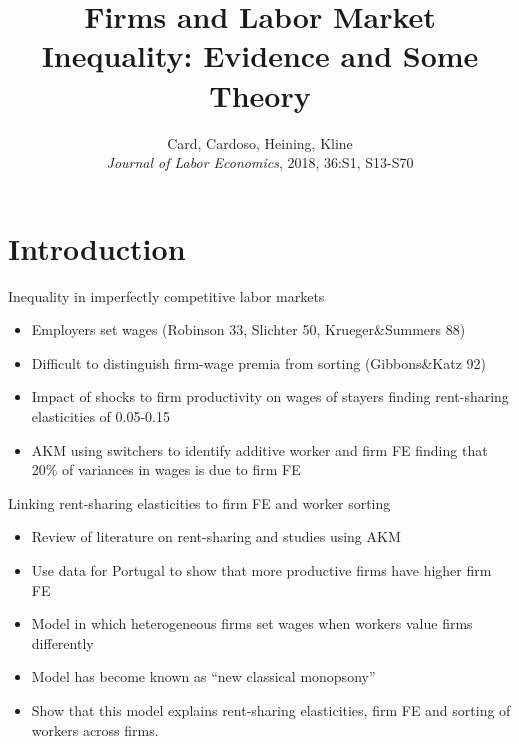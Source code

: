 \documentclass[notes=show]{beamer}
\begin{document}
\title{Firms and Labor Market Inequality: Evidence and Some Theory}
\subtitle{}
\date{Card, Cardoso, Heining, Kline \bigskip \\
\textit{Journal of Labor Economics}, 2018, 36:S1, S13-S70}
\author{}
\maketitle

\section{Introduction}

\begin{frame}{Inequality in imperfectly competitive labor markets}
\begin{itemize}
\item Employers set wages (Robinson 33, Slichter 50, Krueger\&Summers 88) \medskip
\item Difficult to distinguish firm-wage premia from sorting (Gibbons\&Katz 92) \medskip
\item Impact of shocks to firm productivity on wages of stayers finding rent-sharing elasticities of 0.05-0.15 \medskip
\item AKM using switchers to identify additive worker and firm FE finding that 20\% of variances in wages is due to firm FE
\end{itemize}
\end{frame}

\begin{frame}{Linking rent-sharing elasticities to firm FE and worker sorting}
\begin{itemize}
\item Review of literature on rent-sharing and studies using AKM \medskip
\item Use data for Portugal to show that more productive firms have higher firm FE \medskip
\item Model in which heterogeneous firms set wages when workers value firms differently \medskip 
\item Model has become known as ``new classical monopsony'' \medskip
\item Show that this model explains rent-sharing elasticities, firm FE and sorting of workers across firms.
\end{itemize}
\end{frame}
\end{document}
